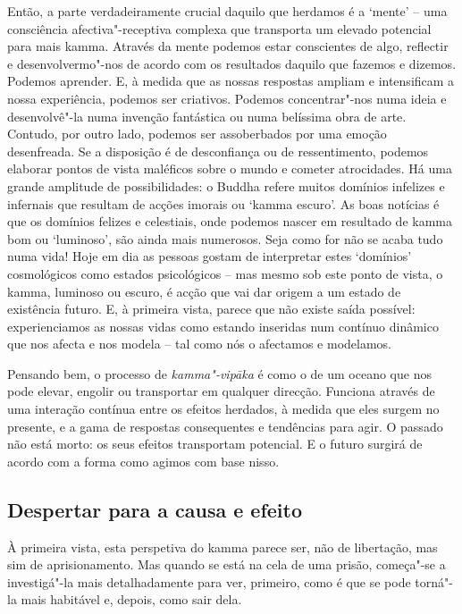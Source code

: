 Então, a parte verdadeiramente crucial daquilo que herdamos é a `mente' -- uma
consciência afectiva"-receptiva complexa que transporta um elevado potencial para
mais kamma. Através da mente podemos estar conscientes de algo, reflectir e
desenvolvermo"-nos de acordo com os resultados daquilo que fazemos e dizemos.
Podemos aprender. E, à medida que as nossas respostas ampliam e intensificam a
nossa experiência, podemos ser criativos. Podemos concentrar"-nos numa ideia e
desenvolvê"-la numa invenção fantástica ou numa belíssima obra de arte. Contudo,
por outro lado, podemos ser assoberbados por uma emoção desenfreada. Se a
disposição é de desconfiança ou de ressentimento, podemos elaborar pontos de
vista maléficos sobre o mundo e cometer atrocidades. Há uma grande amplitude de
possibilidades: o Buddha refere muitos domínios infelizes e infernais que
resultam de acções imorais ou `kamma escuro'. As boas notícias é que os domínios
felizes e celestiais, onde podemos nascer em resultado de kamma bom ou
`luminoso', são ainda mais numerosos.
Seja como for não se acaba tudo
numa vida! Hoje em dia as pessoas gostam de interpretar estes `domínios'
cosmológicos como estados psicológicos -- mas mesmo sob este ponto de vista, o
kamma, luminoso ou escuro, é acção que vai dar origem a um estado de existência
futuro. E, à primeira vista, parece que não existe saída possível:
experienciamos as nossas vidas como estando inseridas num contínuo dinâmico que
nos afecta e nos modela -- tal como nós o afectamos e modelamos.

Pensando bem, o processo de \emph{kamma"-vipāka} é como o de um oceano que nos
pode elevar, engolir ou transportar em qualquer direcção. Funciona através de
uma interação contínua entre os efeitos herdados, à medida que eles surgem no
presente, e a gama de respostas consequentes e tendências para agir. O passado
não está morto: os seus efeitos transportam potencial. E o futuro surgirá de
acordo com a forma como agimos com base nisso.

\subsection{Despertar para a causa e efeito}

À primeira vista, esta perspetiva do kamma parece ser, não de libertação, mas
sim de aprisionamento. Mas quando se está na cela de uma prisão, começa"-se a
investigá"-la mais detalhadamente para ver, primeiro, como é que se pode torná"-la
mais habitável e, depois, como sair dela.


